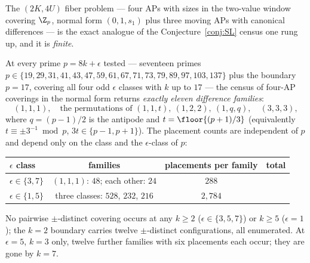 The $(2K,4U)$ fiber problem --- four APs with sizes in the two-value
window covering $\Z_p$, normal form $(0,1,s_1)$ plus three moving APs
with canonical differences --- is the exact analogue of the
Conjecture~\ref{conj:SL} census one rung up, and it is \emph{finite}.

\begin{proposition}
\label{prop:T8census}
At every prime $p=8k+\epsilon$ tested --- seventeen primes
$p\in\{19,29,31,41,43,47,59,61,67,71,73,79,89,97,103,137\}$ plus the
boundary $p=17$, covering all four odd $\epsilon$ classes with $k$ up to
$17$ --- the census of four-AP coverings in the normal form returns
\emph{exactly eleven difference families}:
\[
(1,1,1),\quad\text{the permutations of }(1,1,t),\ (1,2,2),\ (1,q,q),
\quad(3,3,3),
\]
where $q=(p-1)/2$ is the antipode and $t=\floor{(p+1)/3}$ (equivalently
$t\equiv\pm3^{-1}\bmod p$, $3t\in\{p-1,p+1\}$). The placement counts are
independent of $p$ and depend only on the class and the $\epsilon$-class
of $p$:
\begin{center}
\small
\begin{tabular}{@{}lccc@{}}
\toprule
$\epsilon$ class & families & placements per family & total \\
\midrule
$\epsilon\in\{3,7\}$ & $(1,1,1)$: $48$; each other: $24$ & $288$ \\
$\epsilon\in\{1,5\}$ & three classes: $528$, $232$, $216$ & $2{,}784$ \\
\bottomrule
\end{tabular}
\end{center}
\noindent No pairwise $\pm$-distinct covering occurs at any $k\ge2$
($\epsilon\in\{3,5,7\}$) or $k\ge5$ ($\epsilon=1$); the $k=2$ boundary
carries twelve $\pm$-distinct configurations, all enumerated. At
$\epsilon=5$, $k=3$ only, twelve further families with six placements
each occur; they are gone by $k=7$.
\end{proposition}

